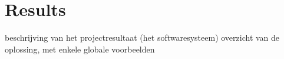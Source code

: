 

\section{Results}
beschrijving van het projectresultaat (het softwaresysteem)
overzicht van de oplossing, met enkele globale voorbeelden
